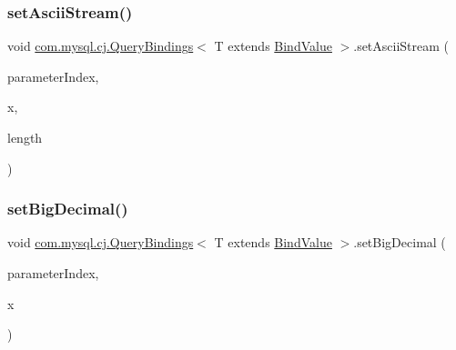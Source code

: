 \mbox{\label{interfacecom_1_1mysql_1_1cj_1_1_query_bindings_ad5b2cb40d03009c8827d234cd7240e0e}} 
\subsubsection{\texorpdfstring{set\+Ascii\+Stream()}{setAsciiStream()}\hspace{0.1cm}{\footnotesize\ttfamily [3/3]}}
{\footnotesize\ttfamily void \mbox{\hyperlink{interfacecom_1_1mysql_1_1cj_1_1_query_bindings}{com.\+mysql.\+cj.\+Query\+Bindings}}$<$ T extends \mbox{\hyperlink{interfacecom_1_1mysql_1_1cj_1_1_bind_value}{Bind\+Value}} $>$.set\+Ascii\+Stream (\begin{DoxyParamCaption}\item[{int}]{parameter\+Index,  }\item[{Input\+Stream}]{x,  }\item[{long}]{length }\end{DoxyParamCaption})}

\mbox{\label{interfacecom_1_1mysql_1_1cj_1_1_query_bindings_af8d9bc42bb6370ea5512c2500f912a79}} 
\subsubsection{\texorpdfstring{set\+Big\+Decimal()}{setBigDecimal()}}
{\footnotesize\ttfamily void \mbox{\hyperlink{interfacecom_1_1mysql_1_1cj_1_1_query_bindings}{com.\+mysql.\+cj.\+Query\+Bindings}}$<$ T extends \mbox{\hyperlink{interfacecom_1_1mysql_1_1cj_1_1_bind_value}{Bind\+Value}} $>$.set\+Big\+Decimal (\begin{DoxyParamCaption}\item[{int}]{parameter\+Index,  }\item[{Big\+Decimal}]{x }\end{DoxyParamCaption})}

